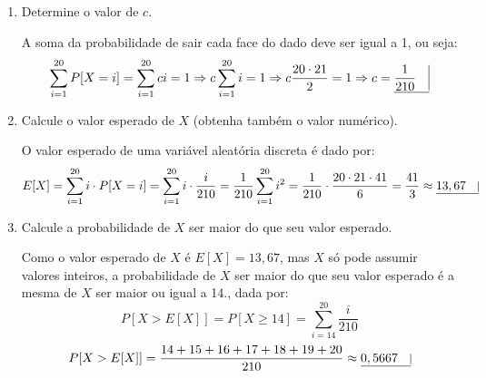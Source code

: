\documentclass[12 pt]{article}
\begin{document}
\begin{enumerate}
    \item Determine o valor de $c$.
    \begin{tcolorbox}[colframe=black, title=Resposta:]
        A soma da probabilidade de sair cada face do dado deve ser igual a 1, ou seja:
        $$\sum_{i=1}^{20} P [X = i] = \sum_{i=1}^{20} ci = 1 \Rightarrow c\sum_{i=1}^{20} i = 1 \Rightarrow c\frac{20 \cdot 21}{2} = 1 \Rightarrow c = \underline{ \frac{1}{210} \quad \vline}$$
    \end{tcolorbox}
    \item Calcule o valor esperado de $X$ (obtenha também o valor numérico).
    \begin{tcolorbox}[colframe=black, title=Resposta:]
        O valor esperado de uma variável aleatória discreta é dado por:
        $$E[X] = \sum_{i=1}^{20} i \cdot P [X = i] = \sum_{i=1}^{20} i \cdot \frac{i}{210} = \frac{1}{210} \sum_{i=1}^{20} i^2 = \frac{1}{210} \cdot \frac{20 \cdot 21 \cdot 41}{6} = \frac{41}{3} \approx \underline{13,67 \quad \vline}$$
    \end{tcolorbox}
    \newpage
    \item Calcule a probabilidade de $X$ ser maior do que seu valor esperado.
    \begin{tcolorbox}[colframe=black, title=Resposta:]
        Como o valor esperado de $X$ é $E[X] = 13,67$, mas $X$ só pode assumir valores inteiros, a probabilidade de $X$ ser maior do que seu valor esperado é a mesma de $X$ ser maior ou igual a 14., dada por:
        $$P [X > E[X]] = P [X \geq 14] =  \sum_{i=14}^{20} \frac{i}{210} $$
        $$P [X > E[X]] = \frac{14+15+16+17+18+19+20}{210} \approx \underline{0,5667 \quad \vline}$$


\end{tcolorbox}
\end{enumerate}
\end{document}
